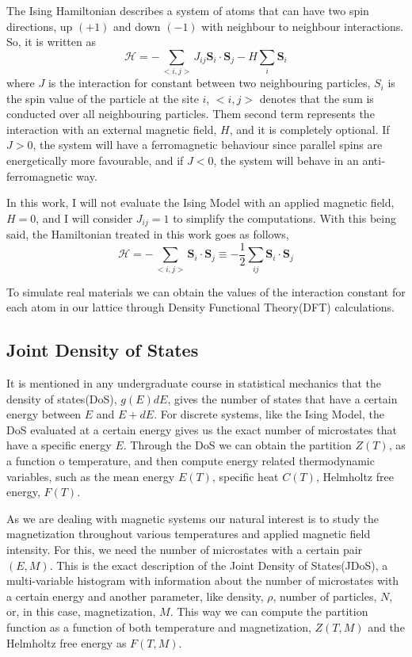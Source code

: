 The Ising Hamiltonian describes a system of atoms that can have two spin directions, up $(+1)$ and down $(-1)$ with neighbour to neighbour interactions. So, it is written as
\begin{equation}
	\mathcal{H} = -\sum_{<i,j>} J_{ij} \boldsymbol{S}_i \cdot \boldsymbol{S}_j - H \sum_i\boldsymbol{S}_i
\end{equation}
where $J$ is the interaction for constant between two neighbouring particles, $S_i$ is the spin value of the particle at the site $i$, $<i,j>$ denotes that the sum is conducted over all neighbouring particles. Them second term represents the interaction with an external magnetic field, $H$, and it is completely optional. If $J>0$, the system will have a ferromagnetic behaviour since parallel spins are energetically more favourable, and if $J<0$, the system will behave in an anti-ferromagnetic way.

In this work, I will not evaluate the Ising Model with an applied magnetic field, $H=0$, and I will consider $J_{ij}=1$ to simplify the computations. With this being said, the Hamiltonian treated in this work goes as follows,
\begin{equation}
	\mathcal{H} = -\sum_{<i,j>} \boldsymbol{S}_i \cdot \boldsymbol{S}_j 	\equiv -\frac{1}{2} \sum_{ij} \boldsymbol{S}_i \cdot \boldsymbol{S}_j
\end{equation}

To simulate real materials we can obtain the values of the interaction constant for each atom in our lattice through Density Functional Theory(DFT) calculations.

\subsection{Joint Density of States}

It is mentioned in any undergraduate course in statistical mechanics that the density of states(DoS), $g(E)dE$, gives the number of states that have a certain energy between $E$ and $E+dE$. For discrete systems, like the Ising Model, the DoS evaluated at a certain energy gives us the exact number of microstates that have a specific energy $E$. Through the DoS we can obtain the partition $Z(T)$, as a function o temperature, and then compute energy related thermodynamic variables, such as the mean energy $E(T)$, specific heat $C(T)$, Helmholtz free energy, $F(T)$. 

As we are dealing with magnetic systems our natural interest is to study the magnetization throughout various temperatures and applied magnetic field intensity. For this, we need the number of microstates with a certain pair $(E,M)$. This is the exact description of the Joint Density of States(JDoS), a multi-variable histogram with information about the number of microstates with a certain energy and another parameter, like density, $\rho$, number of particles, $N$, or, in this case, magnetization, $M$. This way we can compute the partition function as a function of both temperature and magnetization, $Z(T,M)$ and the Helmholtz free energy as $F(T,M)$.

